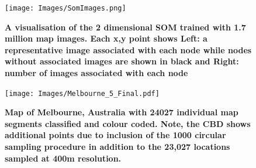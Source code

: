 \documentclass{article}
\begin{document}
\begin{figure}
\centering    
\texttt{[image: Images/SomImages.png]}  
\caption{\bf  A visualisation of the 2 dimensional SOM trained with 1.7 million map images.  Each x,y point shows Left: a representative image associated with each node while nodes without associated images are shown in black and Right: number of images associated with each node}    
 \label{fig:somresults}  
\end{figure} 

\begin{figure}
\centering    
\texttt{[image: Images/Melbourne\_5\_Final.pdf]}  
\caption{\bf  Map of Melbourne, Australia with 24027 individual map segments classified and colour coded. Note, the CBD shows additional points due to inclusion of the 1000 circular sampling procedure in addition to the 23,027 locations sampled at 400m resolution. }    
 \label{fig:mel23000}  
\end{figure} 
\end{document}

